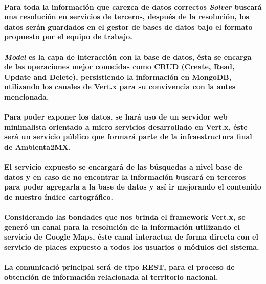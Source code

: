     \paragraph{Para toda la información que carezca de datos correctos \textbf{\emph{Solver}} buscará una resolución en servicios de terceros, después de la resolución, los datos serán guardados en el gestor de bases de datos bajo el formato propuesto por el equipo de trabajo.}
    \paragraph{\textbf{\emph{Model}} es la capa de interacción con la base de datos, ésta se encarga de las operaciones mejor conocidas como CRUD (Create, Read, Update and Delete),  persistiendo la información en MongoDB, utilizando los canales de Vert.x para su convivencia con la antes mencionada.}
    \paragraph{Para poder exponer los datos, se hará uso de un servidor web minimalista orientado a micro servicios desarrollado en Vert.x, éste será un servicio público que formará parte de la infraestructura final de Ambienta2MX.}
    \paragraph{El servicio expuesto se encargará de las búsquedas a nivel base de datos y en caso de no encontrar la información buscará en terceros para poder agregarla a la base de datos y así ir mejorando el contenido de nuestro índice cartográfico.}
    \paragraph{Considerando las bondades que nos brinda el framework Vert.x, se generó un canal para la resolución de la información utilizando el servicio de Google Maps, éste canal interactua de forma directa con el servicio de places expuesto a todos los usuarios o módulos del sistema.}
    \paragraph{La comunicació principal será de tipo REST, para el proceso de obtención de información relacionada al territorio nacional.}